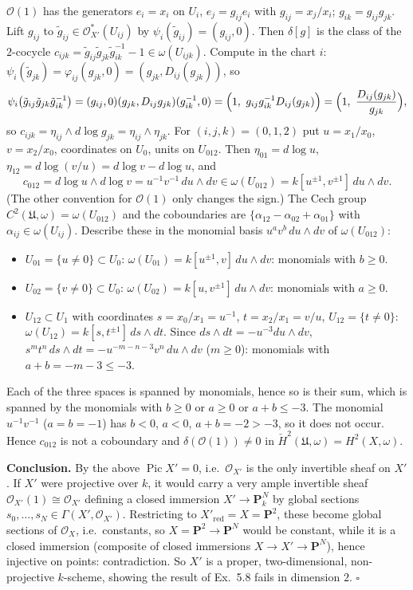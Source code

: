 \documentclass[11pt]{article}
\begin{document}
$\mathcal O(1)$ has the generators $e_i=x_i$ on $U_i$, $e_j=g_{ij}e_i$ with $g_{ij}=x_j/x_i$; $g_{ik}=g_{ij}g_{jk}$. Lift $g_{ij}$ to $\tilde g_{ij}\in\mathcal O_{X'}^*(U_{ij})$ by $\psi_i(\tilde g_{ij})=(g_{ij},0)$. Then $\delta[g]$ is the class of the $2$-cocycle $c_{ijk}=\tilde g_{ij}\tilde g_{jk}\tilde g_{ik}^{-1}-1\in\omega(U_{ijk})$. Compute in the chart $i$: $\psi_i(\tilde g_{jk})=\varphi_{ij}(g_{jk},0)=(g_{jk},D_{ij}(g_{jk}))$, so
\[
\psi_i\bigl(\tilde g_{ij}\tilde g_{jk}\tilde g_{ik}^{-1}\bigr)=(g_{ij},0)(g_{jk},D_{ij}g_{jk})(g_{ik}^{-1},0)=\Bigl(1,\ g_{ij}g_{ik}^{-1}D_{ij}(g_{jk})\Bigr)=\Bigl(1,\ \frac{D_{ij}(g_{jk})}{g_{jk}}\Bigr),
\]
so $c_{ijk}=\eta_{ij}\wedge d\log g_{jk}=\eta_{ij}\wedge\eta_{jk}$. For $(i,j,k)=(0,1,2)$ put $u=x_1/x_0$, $v=x_2/x_0$, coordinates on $U_0$, units on $U_{012}$. Then $\eta_{01}=d\log u$, $\eta_{12}=d\log(v/u)=d\log v-d\log u$, and
\[
c_{012}=d\log u\wedge d\log v=u^{-1}v^{-1}\,du\wedge dv\in\omega(U_{012})=k[u^{\pm1},v^{\pm1}]\,du\wedge dv.
\]
(The other convention for $\mathcal O(1)$ only changes the sign.) The Cech group $C^2(\mathfrak U,\omega)=\omega(U_{012})$ and the coboundaries are $\{\alpha_{12}-\alpha_{02}+\alpha_{01}\}$ with $\alpha_{ij}\in\omega(U_{ij})$. Describe these in the monomial basis $u^av^b\,du\wedge dv$ of $\omega(U_{012})$:
\begin{itemize}
\item $U_{01}=\{u\ne0\}\subset U_0$: $\omega(U_{01})=k[u^{\pm1},v]\,du\wedge dv$: monomials with $b\ge0$.
\item $U_{02}=\{v\ne0\}\subset U_0$: $\omega(U_{02})=k[u,v^{\pm1}]\,du\wedge dv$: monomials with $a\ge0$.
\item $U_{12}\subset U_1$ with coordinates $s=x_0/x_1=u^{-1}$, $t=x_2/x_1=v/u$, $U_{12}=\{t\ne0\}$: $\omega(U_{12})=k[s,t^{\pm1}]\,ds\wedge dt$. Since $ds\wedge dt=-u^{-3}du\wedge dv$, $s^mt^n\,ds\wedge dt=-u^{-m-n-3}v^n\,du\wedge dv$ ($m\ge0$): monomials with $a+b=-m-3\le-3$.
\end{itemize}
Each of the three spaces is spanned by monomials, hence so is their sum, which is spanned by the monomials with $b\ge0$ or $a\ge0$ or $a+b\le-3$. The monomial $u^{-1}v^{-1}$ ($a=b=-1$) has $b<0$, $a<0$, $a+b=-2>-3$, so it does not occur. Hence $c_{012}$ is not a coboundary and $\delta(\mathcal O(1))\ne0$ in $\check H^2(\mathfrak U,\omega)=H^2(X,\omega)$.

\textbf{Conclusion.} By the above $\operatorname{Pic}X'=0$, i.e.\ $\mathcal O_{X'}$ is the only invertible sheaf on $X'$. If $X'$ were projective over $k$, it would carry a very ample invertible sheaf $\mathcal O_{X'}(1)\cong\mathcal O_{X'}$ defining a closed immersion $X'\to\mathbf P^N_k$ by global sections $s_0,\dots,s_N\in\Gamma(X',\mathcal O_{X'})$. Restricting to $X'_{\mathrm{red}}=X=\mathbf P^2$, these become global sections of $\mathcal O_X$, i.e.\ constants, so $X=\mathbf P^2\to\mathbf P^N$ would be constant, while it is a closed immersion (composite of closed immersions $X\to X'\to\mathbf P^N$), hence injective on points: contradiction. So $X'$ is a proper, two-dimensional, non-projective $k$-scheme, showing the result of Ex.~5.8 fails in dimension $2$. \hfill$\square$
\end{document}
